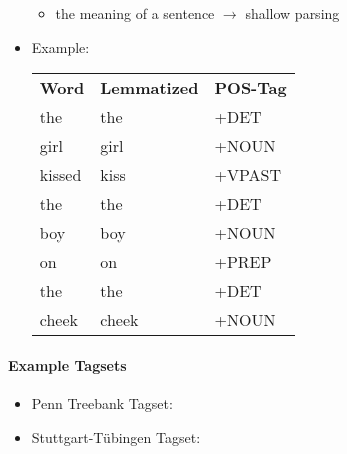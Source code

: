 \begin{itemize}
\begin{itemize}
                			\item the meaning of a sentence \( \rightarrow \) shallow parsing
                		\end{itemize}
                	\item Example:
                		\begin{table}[H]
                			\centering
                			\begin{tabular}{l l l}
                				\textbf{Word} & \textbf{Lemmatized} & \textbf{POS-Tag} \\
                				the           & the                 & +DET             \\
                				girl          & girl                & +NOUN            \\
                				kissed        & kiss                & +VPAST           \\
                				the           & the                 & +DET             \\
                				boy           & boy                 & +NOUN            \\
                				on            & on                  & +PREP            \\
                				the           & the                 & +DET             \\
                				cheek         & cheek               & +NOUN
                			\end{tabular}
                		\end{table}
                \end{itemize}

				\paragraph{Example Tagsets} %
					\begin{itemize}
						\item Penn Treebank Tagset: 
						\item Stuttgart-Tübingen Tagset: 
					\end{itemize}

